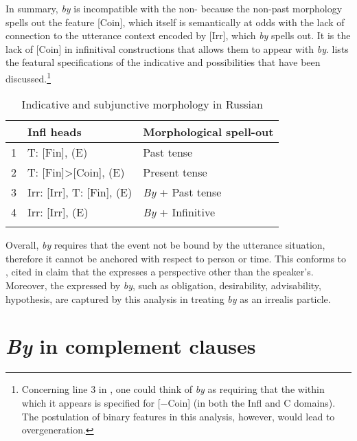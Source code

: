 \documentclass[output=paper,modfonts,newtxmath,hidelinks,]{langscibook}
\begin{document}
In summary, \textit{by} is incompatible with the non- because the non-past morphology spells out the feature [Coin], which itself is semantically at odds with the lack of connection to the utterance context encoded by [Irr], which \textit{by} spells out. It is the lack of [Coin] in infinitival constructions that allows them to appear with \textit{by}.  lists the featural specifications of the indicative and  possibilities that have been discussed.\footnote{\label{10:fn4}Concerning line 3 in , one could think of \textit{by} as requiring that the  within which it appears is specified for [$-$Coin] (in both the Infl and C domains). The postulation of binary features in this analysis, however, would lead to overgeneration.}

\begin{table}[h]
\caption{Indicative and subjunctive morphology in Russian}
\label{10:table2}
\begin{tabularx}{.80\textwidth}{rlX}
\lsptoprule
&\textbf{Infl heads} & \textbf{Morphological spell-out}\\
\midrule
1&T: [Fin], (E) & Past tense\\
2&T: [Fin]>[Coin], (E) & Present tense\\
3&Irr: [Irr], T: [Fin], (E) & \textit{By} + Past tense\\
4&Irr: [Irr], (E) & \textit{By} + Infinitive\\
\lspbottomrule
\end{tabularx}
\label{10:table:table_2}
\end{table}

Overall, \textit{by} requires that the event not be bound by the utterance situation, therefore it cannot be anchored with respect to person or time. This conforms to , cited in \citet[10]{Cowper2002} claim that the  expresses a perspective other than the speaker’s. Moreover, the  expressed by \textit{by}, such as obligation, desirability, advisability, hypothesis, are captured by this analysis in treating \textit{by} as an irrealis particle.



\section{\textit{By} in complement clauses}\label{10:s5}
\end{document}
